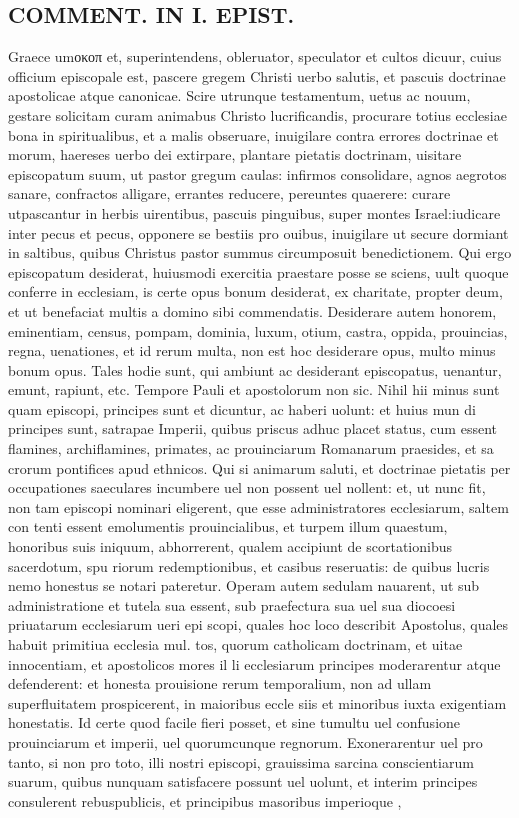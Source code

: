 \documentclass{article}
\begin{document}
\begin{pages}
\section*{COMMENT. IN I. EPIST. }
\marginpar{[ p.490 ]}\pstart Graece umοκοπ et, superintendens, obleruator, speculator et cultos dicuur, cuius officium episcopale est, pascere gregem Christi uerbo salutis, et pascuis doctrinae apostolicae atque canonicae. Scire utrunque testamentum, uetus ac nouum, gestare solicitam curam animabus Christo lucrificandis, procurare totius ecclesiae bona in spiritualibus, et a malis obseruare, inuigilare contra errores doctrinae et morum, haereses uerbo dei extirpare, plantare pietatis doctrinam, uisitare episcopatum suum, ut pastor gregum caulas: infirmos consolidare, agnos aegrotos sanare, confractos alligare, errantes reducere, pereuntes quaerere: curare utpascantur in herbis uirentibus, pascuis pinguibus, super montes Israel:iudicare inter pecus et pecus, opponere se bestiis pro ouibus, inuigilare ut secure dormiant in saltibus, quibus Christus pastor summus circumposuit benedictionem. Qui ergo episcopatum desiderat, huiusmodi exercitia praestare posse se sciens, uult quoque conferre in ecclesiam, is certe opus bonum desiderat, ex charitate, propter deum, et ut benefaciat multis a domino sibi commendatis. Desiderare autem honorem, eminentiam, census, pompam, dominia, luxum, otium, castra, oppida, prouincias, regna, uenationes, et id rerum multa, non est hoc desiderare opus, multo minus bonum opus. Tales hodie sunt, qui ambiunt ac desiderant episcopatus, uenantur, emunt, rapiunt, etc. Tempore Pauli et apostolorum non sic. Nihil hii minus sunt quam episcopi, principes sunt et dicuntur, ac haberi uolunt: et huius mun di principes sunt, satrapae Imperii, quibus priscus adhuc placet status, cum essent flamines, archiflamines, primates, ac prouinciarum Romanarum praesides, et sa crorum pontifices apud ethnicos. Qui si animarum saluti, et doctrinae pietatis per occupationes saeculares incumbere uel non possent uel nollent: et, ut nunc fit, non tam episcopi nominari eligerent, que esse administratores ecclesiarum, saltem con tenti essent emolumentis prouincialibus, et turpem illum quaestum, honoribus suis iniquum, abhorrerent, qualem accipiunt de scortationibus sacerdotum, spu riorum redemptionibus, et casibus reseruatis: de quibus lucris nemo honestus se notari pateretur. Operam autem sedulam nauarent, ut sub administratione et tutela sua essent, sub praefectura sua uel sua diocoesi priuatarum ecclesiarum ueri epi scopi, quales hoc loco describit Apostolus, quales habuit primitiua ecclesia mul. tos, quorum catholicam doctrinam, et uitae innocentiam, et apostolicos mores il li ecclesiarum principes moderarentur atque defenderent: et honesta prouisione rerum temporalium, non ad ullam superfluitatem prospicerent, in maioribus eccle siis et minoribus iuxta exigentiam honestatis. Id certe quod facile fieri posset, et sine tumultu uel confusione prouinciarum et imperii, uel quorumcunque regnorum. Exonerarentur uel pro tanto, si non pro toto, illi nostri episcopi, grauissima sarcina conscientiarum suarum, quibus nunquam satisfacere possunt uel uolunt, et interim principes consulerent rebuspublicis, et principibus masoribus imperioque , 
\end{pages}
\end{document}
